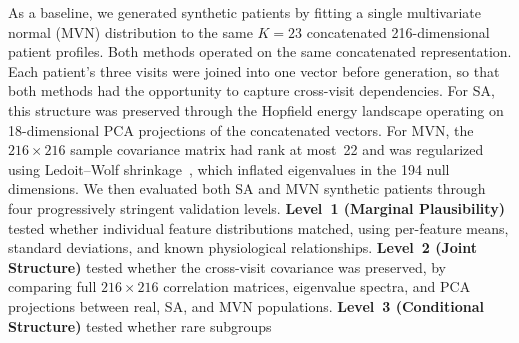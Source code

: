 As a baseline, we generated synthetic patients by fitting a single multivariate
normal (MVN) distribution to the same $K{=}23$ concatenated 216-dimensional patient
profiles. Both methods operated on the same concatenated
representation. Each patient's three visits were joined into one vector before
generation, so that both methods had the opportunity to capture cross-visit
dependencies. For SA, this structure was preserved through the Hopfield energy
landscape operating on 18-dimensional PCA projections of the concatenated vectors.
For MVN, the $216 \times 216$ sample covariance matrix had rank at most~22 and was
regularized using Ledoit--Wolf shrinkage~\citep{Ledoit2004}, which inflated
eigenvalues in the 194 null dimensions.
We then evaluated both SA and MVN synthetic patients through four progressively stringent
validation levels.
\textbf{Level~1 (Marginal Plausibility)} tested whether individual feature
distributions matched, using per-feature means, standard deviations, and known
physiological relationships. \textbf{Level~2 (Joint Structure)} tested whether the
cross-visit covariance was preserved, by comparing full $216 \times 216$ correlation
matrices, eigenvalue spectra, and PCA projections between real, SA, and MVN
populations. \textbf{Level~3 (Conditional Structure)} tested whether rare subgroups
